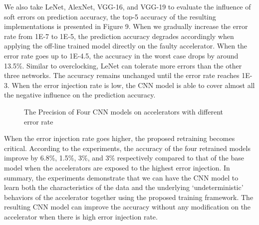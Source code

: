   We also take LeNet, AlexNet, VGG-16, and VGG-19 to evaluate the influence of soft errors on prediction accuracy,
the top-5 accuracy of the resulting implementations is presented in Figure 9. When we gradually 
increase the error rate from 1E-7 to 1E-5, the prediction accuracy degrades accordingly when applying the off-line 
trained model directly on the faulty accelerator. When the error rate goes up to 1E-4.5, 
the accuracy in the worst case drops by around 13.5\%. Similar to overclocking, LeNet can tolerate 
more errors than the other three networks. The accuracy remains unchanged until the error rate reaches 1E-3. 
When the error injection rate is low, the CNN model is able to cover almost all the negative influence 
on the prediction accuracy.

\begin{figure}
        \center
        \qquad
        \qquad
        \qquad
        \caption{The Precision of Four CNN models on accelerators with different error rate}
        \label{fig:softerror accuracy}
\end{figure}


  When the error injection rate goes higher, the proposed retraining becomes critical. 
According to the experiments, the accuracy of the four retrained models improve by 6.8\%, 1.5\%, 3\%, and 3\% 
respectively compared to that of the base model when the accelerators are exposed to the highest 
error injection. In summary, the experiments demonstrate that we can have the CNN model to learn 
both the characteristics of the data and the underlying ‘undeterministic’ behaviors of the accelerator 
together using the proposed training framework. The resulting CNN model can improve the accuracy 
without any modification on the accelerator when there is high error injection rate.  


